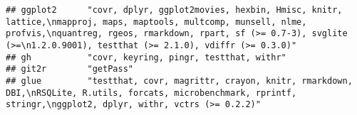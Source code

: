 \documentclass[]{book}
\begin{document}
\begin{verbatim}
## ggplot2      "covr, dplyr, ggplot2movies, hexbin, Hmisc, knitr, lattice,\nmapproj, maps, maptools, multcomp, munsell, nlme, profvis,\nquantreg, rgeos, rmarkdown, rpart, sf (>= 0.7-3), svglite (>=\n1.2.0.9001), testthat (>= 2.1.0), vdiffr (>= 0.3.0)"                                                                                                                                                                                                                                                                                                                                                                                                                                                              
## gh           "covr, keyring, pingr, testthat, withr"                                                                                                                                                                                                                                                                                                                                                                                                                                                                                                                                                                                                                                                                   
## git2r        "getPass"                                                                                                                                                                                                                                                                                                                                                                                                                                                                                                                                                                                                                                                                                                 
## glue         "testthat, covr, magrittr, crayon, knitr, rmarkdown, DBI,\nRSQLite, R.utils, forcats, microbenchmark, rprintf, stringr,\nggplot2, dplyr, withr, vctrs (>= 0.2.2)"                                                                                                                                                                                                                                                                                                                                                                                                                                                                                                                                         

\end{verbatim}
\end{document}
